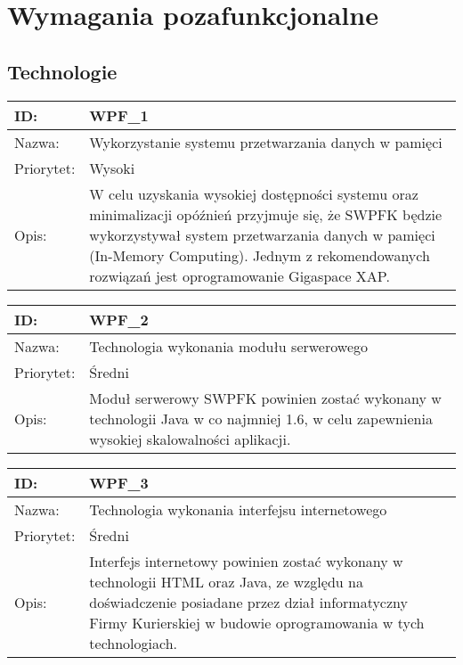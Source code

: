 \section{Wymagania pozafunkcjonalne}

\subsection{Technologie}
\begin{center}
\begin{tabular}[h]{|p{1.6cm}|p{13.5cm}|}
\hline
ID: & WPF\_1 \\ \hline
Nazwa: & Wykorzystanie systemu przetwarzania danych w pamięci \\ \hline
Priorytet: & Wysoki \\ \hline
Opis: & W celu uzyskania wysokiej dostępności systemu oraz minimalizacji opóźnień przyjmuje się, że SWPFK będzie wykorzystywał system przetwarzania danych w pamięci (In-Memory Computing). Jednym z rekomendowanych rozwiązań jest oprogramowanie Gigaspace XAP. \\
\hline
\end{tabular}
\end{center}

\begin{center}
\begin{tabular}[h]{|p{1.6cm}|p{13.5cm}|}
\hline
ID: & WPF\_2 \\ \hline
Nazwa: & Technologia wykonania modułu serwerowego \\ \hline
Priorytet: & Średni \\ \hline
Opis: & Moduł serwerowy SWPFK powinien zostać wykonany w technologii Java w co najmniej 1.6, w celu zapewnienia wysokiej skalowalności aplikacji. \\
\hline
\end{tabular}
\end{center}

\begin{center}
\begin{tabular}[h]{|p{1.6cm}|p{13.5cm}|}
\hline
ID: & WPF\_3 \\ \hline
Nazwa: & Technologia wykonania interfejsu internetowego \\ \hline
Priorytet: & Średni \\ \hline
Opis: & Interfejs internetowy powinien zostać wykonany w technologii HTML oraz Java, ze względu na doświadczenie posiadane przez dział informatyczny Firmy Kurierskiej w budowie oprogramowania w tych technologiach. \\
\hline
\end{tabular}
\end{center}

